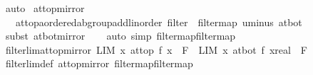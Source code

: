 \begin{isabellebody}
\isamarkupfalse%
\ auto%
\endisatagproof
{\isafoldproof}%
%
\isadelimproof
\isanewline
%
\endisadelimproof
\isanewline
{}\isamarkupfalse%
\ at{\isacharunderscore}{\kern0pt}top{\isacharunderscore}{\kern0pt}mirror\ {\isacharcolon}{\kern0pt}\isanewline
\ \ \ {\isachardoublequoteopen}{\isacharparenleft}{\kern0pt}at{\isacharunderscore}{\kern0pt}top{\isacharcolon}{\kern0pt}{\isacharcolon}{\kern0pt}{\isacharparenleft}{\kern0pt}{\isacharprime}{\kern0pt}a{\isacharcolon}{\kern0pt}{\isacharcolon}{\kern0pt}{\isacharbraceleft}{\kern0pt}ordered{\isacharunderscore}{\kern0pt}ab{\isacharunderscore}{\kern0pt}group{\isacharunderscore}{\kern0pt}add{\isacharcomma}{\kern0pt}linorder{\isacharbraceright}{\kern0pt}\ filter{\isacharparenright}{\kern0pt}{\isacharparenright}{\kern0pt}\ {\isacharequal}{\kern0pt}\ filtermap\ uminus\ at{\isacharunderscore}{\kern0pt}bot{\isachardoublequoteclose}\isanewline
%
\isadelimproof
\ \ %
\endisadelimproof
%
\isatagproof
{}\isamarkupfalse%
\ {\isacharparenleft}{\kern0pt}subst\ at{\isacharunderscore}{\kern0pt}bot{\isacharunderscore}{\kern0pt}mirror{\isacharparenright}{\kern0pt}\isanewline
\ \ \isamarkupfalse%
\ {\isacharparenleft}{\kern0pt}auto\ simp{\isacharcolon}{\kern0pt}\ filtermap{\isacharunderscore}{\kern0pt}filtermap{\isacharparenright}{\kern0pt}%
\endisatagproof
{\isafoldproof}%
%
\isadelimproof
\isanewline
%
\endisadelimproof
\isanewline
{}\isamarkupfalse%
\ filterlim{\isacharunderscore}{\kern0pt}at{\isacharunderscore}{\kern0pt}top{\isacharunderscore}{\kern0pt}mirror{\isacharcolon}{\kern0pt}\ {\isachardoublequoteopen}{\isacharparenleft}{\kern0pt}LIM\ x\ at{\isacharunderscore}{\kern0pt}top{\isachardot}{\kern0pt}\ f\ x\ {\isacharcolon}{\kern0pt}{\isachargreater}{\kern0pt}\ F{\isacharparenright}{\kern0pt}\ {\isasymlongleftrightarrow}\ {\isacharparenleft}{\kern0pt}LIM\ x\ at{\isacharunderscore}{\kern0pt}bot{\isachardot}{\kern0pt}\ f\ {\isacharparenleft}{\kern0pt}{\isacharminus}{\kern0pt}x{\isacharcolon}{\kern0pt}{\isacharcolon}{\kern0pt}real{\isacharparenright}{\kern0pt}\ {\isacharcolon}{\kern0pt}{\isachargreater}{\kern0pt}\ F{\isacharparenright}{\kern0pt}{\isachardoublequoteclose}\isanewline
%
\isadelimproof
\ \ %
\endisadelimproof
%
\isatagproof
{}\isamarkupfalse%
\ filterlim{\isacharunderscore}{\kern0pt}def\ at{\isacharunderscore}{\kern0pt}top{\isacharunderscore}{\kern0pt}mirror\ filtermap{\isacharunderscore}{\kern0pt}filtermap\ \isacommand{{\isachardot}{\kern0pt}{\isachardot}{\kern0pt}}\isamarkupfalse%
%
\endisatagproof
{\isafoldproof}%

\end{isabellebody}
